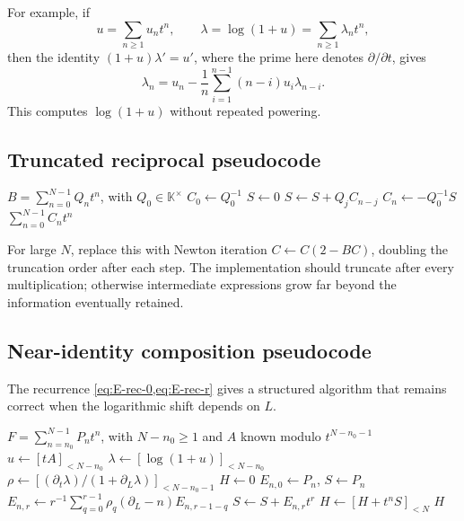 \documentclass[11pt]{article}
\theoremstyle{pltheorem}
\newcommand{\K}{\mathbb K}
\begin{document}
For example, if
\[
 u=\sum_{n\ge1}u_nt^n,
 \qquad
 \lambda=\log(1+u)=\sum_{n\ge1}\lambda_nt^n,
\]
then the identity \((1+u)\lambda'=u'\), where the prime here denotes \(\partial/\partial t\), gives
\begin{equation}\label{eq:log1p-coeff-recurrence}
 \lambda_n=u_n-\frac{1}{n}\sum_{i=1}^{n-1}(n-i)u_i\lambda_{n-i}.
\end{equation}
This computes \(\log(1+u)\) without repeated powering.

\subsection{Truncated reciprocal pseudocode}

\begin{algorithm}[htbp]
\caption{Reciprocal modulo \(t^N\)}
\label{alg:reciprocal}
\begin{algorithmic}[1]
\Require \(B=\sum_{n=0}^{N-1}Q_nt^n\), with \(Q_0\in\K^\times\)
\State \(C_0\gets Q_0^{-1}\)
  \State \(S\gets0\)
    \State \(S\gets S+Q_jC_{n-j}\)
  \EndFor
  \State \(C_n\gets-Q_0^{-1}S\)
\EndFor
\State \Return \(\sum_{n=0}^{N-1}C_nt^n\)
\end{algorithmic}
\end{algorithm}

For large \(N\), replace this with Newton iteration
\(C\leftarrow C(2-BC)\), doubling the truncation order after each step.  The implementation should truncate after every multiplication; otherwise intermediate expressions grow far beyond the information eventually retained.

\subsection{Near-identity composition pseudocode}

The recurrence \cref{eq:E-rec-0,eq:E-rec-r} gives a structured algorithm
that remains correct when the logarithmic shift depends on \(L\).

\begin{algorithm}[htbp]
\caption{Compose \(F\) with \(G=x+A\) modulo \(t^N\)}
\label{alg:composition}
\begin{algorithmic}[1]
\Require \(F=\sum_{n=n_0}^{N-1}P_nt^n\), with \(N-n_0\ge1\) and \(A\) known modulo \(t^{N-n_0-1}\)
\State \(u\gets[tA]_{<N-n_0}\)
\State \(\lambda\gets[\log(1+u)]_{<N-n_0}\)
\State \(\rho\gets[(\partial_t\lambda)/(1+\partial_L\lambda)]_{<N-n_0-1}\)
\State \(H\gets0\)
  \State \(E_{n,0}\gets P_n\), \(S\gets P_n\)
    \State \(E_{n,r}\gets r^{-1}\sum_{q=0}^{r-1}
      \rho_q(\partial_L-n)E_{n,r-1-q}\)
    \State \(S\gets S+E_{n,r}t^r\)
  \EndFor
  \State \(H\gets[H+t^nS]_{<N}\)
\EndFor
\State \Return \(H\)
\end{algorithmic}
\end{algorithm}
\end{document}
